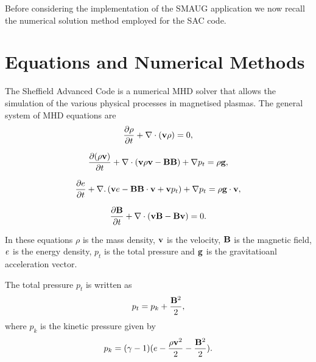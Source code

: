 


 
Before considering the implementation of the SMAUG application we now recall the numerical solution method employed for the SAC code. 

\section{Equations and Numerical Methods}
The Sheffield Advanced Code \citep{Shelyag et al. 2008} is a numerical MHD solver that allows the simulation of the various physical processes in magnetised plasmas. The general system of MHD equations are
\begin{equation}\label{eqdens}
{{\partial \rho}\over{\partial t}}+\nabla\cdot\left( {\bf v}\rho\right)=0,
\end{equation}

\begin{equation}\label{eqmom}
{{\partial ( \rho {\bf v})}\over{\partial t}}+\nabla\cdot\left( {\bf v}\rho {\bf v}-{\bf B B}\right)+\nabla p_t=\rho{\bf g},
\end{equation}

\begin{equation}\label{eqe}
{{\partial e}\over{\partial t}}+\nabla.\left({\bf v}e-{\bf B B}\cdot{\bf v}+{\bf v}p_{t}\right)+\nabla p_t=\rho{\bf g}\cdot{\bf v},
\end{equation}

\begin{equation}\label{eqb}
{{\partial{\bf B}}\over{\partial t}} +\nabla \cdot\left(  {\bf vB}-{\bf Bv}\right)=0.
\end{equation}

In these equations $\rho$ is the mass density, $  \bf { v} $ is the velocity,   $ \bf B$ is the magnetic field, $\it{e}$ is the energy density, $p_{t}$ is the total pressure and $\bf g$ is the gravitatioanl acceleration vector.

The total pressure $p_{t}$ is written as
\begin{equation}\label{eqpt}
p_{t}=p_{k}+{{\bf B}^{2}\over{2}},
\end{equation}
where $p_k$ is the kinetic pressure given by
\begin{equation}\label{eqpk}
p_{k}=(\gamma - 1)( e-{{\rho \bf v }^{2}\over{2}}-  {{\bf B}^{2}\over{2}} ).
\end{equation}

